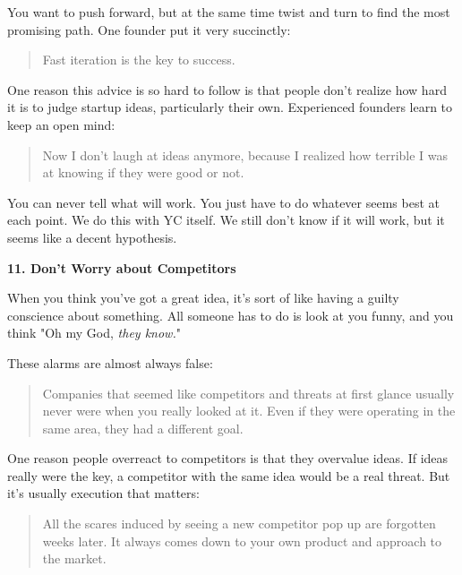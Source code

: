                   You want to push forward, but at the same time twist and turn
                  to find the most promising path. One founder put it very
                  succinctly:
                  \begin{quote}
Fast iteration is the key to success.
\end{quote}

                  One reason this advice is so hard to follow is that people
                  don't realize how hard it is to judge startup ideas,
                  particularly their own. Experienced founders learn to keep an
                  open mind:
                  \begin{quote}

                    Now I don't laugh at ideas anymore, because I realized how
                    terrible I was at knowing if they were good or not.
                  
\end{quote}

                  You can never tell what will work. You just have to do
                  whatever seems best at each point. We do this with YC itself.
                  We still don't know if it will work, but it seems like a
                  decent hypothesis.


                  \textbf{11. Don't Worry about Competitors}

When you
                  think you've got a great idea, it's sort of like having a
                  guilty conscience about something. All someone has to do is
                  look at you funny, and you think "Oh my God,
                  \emph{they know.}"

These alarms are almost always
                  false:
                  \begin{quote}

                    Companies that seemed like competitors and threats at first
                    glance usually never were when you really looked at it. Even
                    if they were operating in the same area, they had a
                    different goal.
                  
\end{quote}

                  One reason people overreact to competitors is that they
                  overvalue ideas. If ideas really were the key, a competitor
                  with the same idea would be a real threat. But it's usually
                  execution that matters:
                  \begin{quote}

                    All the scares induced by seeing a new competitor pop up are
                    forgotten weeks later. It always comes down to your own
                    product and approach to the market.
                  
\end{quote}

